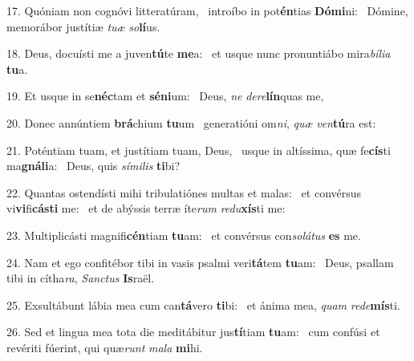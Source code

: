 17. Quóniam non cognóvi litteratúram, \dag\  introíbo in pot\textbf{én}tias \textbf{Dó}\textbf{mi}ni: \ast\  Dómine, memorábor justítiæ \textit{tu}\textit{æ} \textit{so}\textbf{lí}us.\

18. Deus, docuísti me a juven\textbf{tú}te \textbf{me}a: \ast\  et usque nunc pronuntiábo mira\textit{bí}\textit{li}\textit{a} \textbf{tu}a.\

19. Et usque in se\textbf{néc}tam et \textbf{sé}\textbf{ni}um: \ast\  Deus, \textit{ne} \textit{de}\textit{re}\textbf{lín}quas me,\

20. Donec annúntiem \textbf{brá}chium \textbf{tu}um \ast\  generatióni om\textit{ni}, \textit{quæ} \textit{ven}\textbf{tú}ra est:\

21. Poténtiam tuam, et justítiam tuam, Deus, \dag\  usque in altíssima, quæ fe\textbf{cís}ti ma\textbf{gná}\textbf{li}a: \ast\  Deus, quis \textit{sí}\textit{mi}\textit{lis} \textbf{ti}bi?\

22. Quantas ostendísti mihi tribulatiónes multas et malas: \dag\  et convérsus vi\textbf{vi}fi\textbf{cás}\textbf{ti} me: \ast\  et de abýssis terræ íte\textit{rum} \textit{re}\textit{du}\textbf{xís}ti me:\

23. Multiplicásti magnifi\textbf{cén}tiam \textbf{tu}am: \ast\  et convérsus con\textit{so}\textit{lá}\textit{tus} \textbf{es} me.\

24. Nam et ego confitébor tibi in vasis psalmi veri\textbf{tá}tem \textbf{tu}am: \ast\  Deus, psallam tibi in cítha\textit{ra}, \textit{Sanc}\textit{tus} \textbf{Is}raël.\

25. Exsultábunt lábia mea cum can\textbf{tá}vero \textbf{ti}bi: \ast\  et ánima mea, \textit{quam} \textit{red}\textit{e}\textbf{mís}ti.\

26. Sed et lingua mea tota die meditábitur jus\textbf{tí}tiam \textbf{tu}am: \ast\  cum confúsi et revériti fúerint, qui quæ\textit{runt} \textit{ma}\textit{la} \textbf{mi}hi.\

